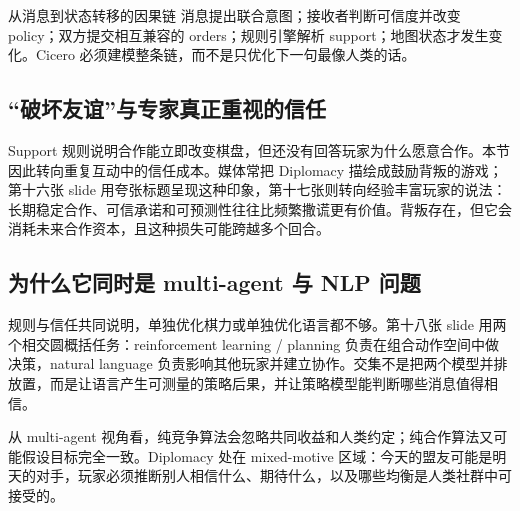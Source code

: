 
\begin{importantbox}{从消息到状态转移的因果链}
消息提出联合意图；接收者判断可信度并改变 policy；双方提交相互兼容的 orders；规则引擎解析 support；地图状态才发生变化。Cicero 必须建模整条链，而不是只优化下一句最像人类的话。
\end{importantbox}

\subsection{“破坏友谊”与专家真正重视的信任}

Support 规则说明合作能立即改变棋盘，但还没有回答玩家为什么愿意合作。本节因此转向重复互动中的信任成本。媒体常把 Diplomacy 描绘成鼓励背叛的游戏；第十六张 slide 用夸张标题呈现这种印象，第十七张则转向经验丰富玩家的说法：长期稳定合作、可信承诺和可预测性往往比频繁撒谎更有价值。背叛存在，但它会消耗未来合作资本，且这种损失可能跨越多个回合。




\subsection{为什么它同时是 multi-agent 与 NLP 问题}

规则与信任共同说明，单独优化棋力或单独优化语言都不够。第十八张 slide 用两个相交圆概括任务：reinforcement learning / planning 负责在组合动作空间中做决策，natural language 负责影响其他玩家并建立协作。交集不是把两个模型并排放置，而是让语言产生可测量的策略后果，并让策略模型能判断哪些消息值得相信。


从 multi-agent 视角看，纯竞争算法会忽略共同收益和人类约定；纯合作算法又可能假设目标完全一致。Diplomacy 处在 mixed-motive 区域：今天的盟友可能是明天的对手，玩家必须推断别人相信什么、期待什么，以及哪些均衡是人类社群中可接受的。

